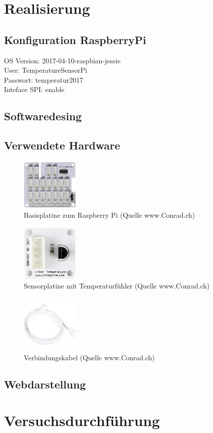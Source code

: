\section{Realisierung}
\subsection{Konfiguration RaspberryPi}
OS Version: 2017-04-10-raspbian-jessie\\
User: TemperatureSensorPi\\
Passwort: temperatur2017\\
Inteface SPI: enable\\

\subsection{Softwaredesing}
\subsection{Verwendete Hardware}

\begin{figure}[H]%
\centering
\includegraphics[width=0.25\textwidth]{Images/Basisplatine.jpg}
\caption{Basisplatine zum Raspberry Pi (Quelle www.Conrad.ch)}
\label{fig:plate}
\end{figure}

\begin{figure}[H]%
\centering
\includegraphics[width=0.25\textwidth]{Images/Sensorplatine.jpg}
\caption{Sensorplatine mit Temperaturfühler (Quelle www.Conrad.ch)}
\label{fig:sensor}
\end{figure}

\begin{figure}[H]%
\centering
\includegraphics[width=0.25\textwidth]{Images/Verbindungskabel.jpg}
\caption{Verbindungskabel (Quelle www.Conrad.ch)}
\label{fig:cable}
\end{figure}

\subsection{Webdarstellung}

\section{Versuchsdurchführung}
